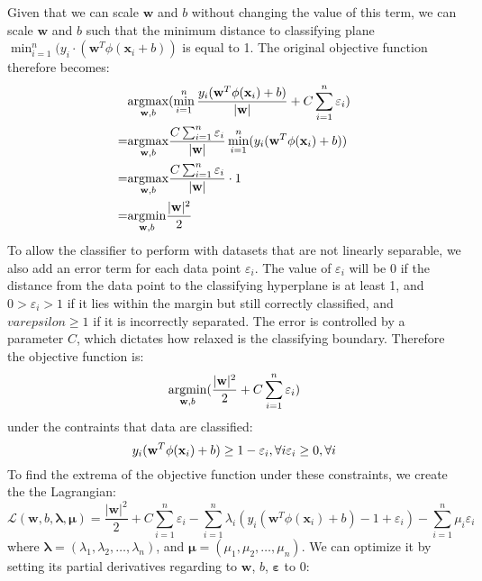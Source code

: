Given that we can scale $\mathbf{w}$ and $b$ without changing the value of this term, we can scale $\mathbf{w}$ and $b$ such that the minimum distance to classifying plane $\min_{i=1}^n(y_i \cdot (\mathbf{w}^T\phi(\mathbf{x}_i + b))$ is equal to 1. The original objective function therefore becomes:
\begin{align*}
    &\underset{\mathbf{w},b}{\operatorname{argmax}}(\min_{i=1}^{n}\frac{y_i(\mathbf{w}^T\phi(\mathbf{x}_i)+b)}{|\mathbf{w}|} + C\sum_{i=1}^n\varepsilon_i)\\
    =&\underset{\mathbf{w},b}{\operatorname{argmax}}\frac{C\sum_{i=1}^n\varepsilon_i}{|\mathbf{w}|}\min_{i=1}^{n}(y_i(\mathbf{w}^T\phi(\mathbf{x}_i)+b)) \\
    =&\underset{\mathbf{w},b}{\operatorname{argmax}}\frac{C\sum_{i=1}^n\varepsilon_i}{|\mathbf{w}|} \cdot 1 \\
    =&\underset{\mathbf{w},b}{\operatorname{argmin}}\frac{|\mathbf{w}|^2}{2}
\end{align*}
To allow the classifier to perform with datasets that are not linearly separable, we also add an error term for each data point $\varepsilon_i$. The value of $\varepsilon_i$ will be $0$ if the distance from the data point to the classifying hyperplane is at least 1, and $0>\varepsilon_i>1$ if it lies within the margin but still correctly classified, and $varepsilon \geq 1$ if it is incorrectly separated. The error is controlled by a parameter $C$, which dictates how relaxed is the classifying boundary. Therefore the objective function is:
\begin{equation*}
    \underset{\mathbf{w},b}{\operatorname{argmin}}(\frac{|\mathbf{w}|^2}{2} + C\sum_{i=1}^n \varepsilon_i)
\end{equation*}
under the contraints that data are classified:
\begin{equation*}
    y_i (\mathbf{w}^T\phi(\mathbf{x}_i) + b) \geq 1 - \varepsilon_i , \forall i\\
    \varepsilon_i \geq 0, \forall i
\end{equation*}
To find the extrema of the objective function under these constraints, we create the the Lagrangian:
\begin{equation} \label{lagr}
    \mathcal{L}(\mathbf{w}, b, \mathbf{\lambda}, \mathbf{\mu})=\frac{|\mathbf{w}|^2}{2} + C\sum_{i=1}^n\varepsilon_i - \sum_{i=1}^n \lambda_i(y_i(\mathbf{w}^T\phi(\mathbf{x}_i) + b) - 1 + \varepsilon_i) - \sum_{i=1}^n \mu_i\varepsilon_i
\end{equation}
where $\mathbf{\lambda}=(\lambda_1, \lambda_2, \ldots, \lambda_n)$, and $\mathbf{\mu}=(\mu_1, \mu_2, \ldots, \mu_n)$. We can optimize it by setting its partial derivatives regarding to $\mathbf{w}$, $b$, $\mathbf{\varepsilon}$ to 0:
